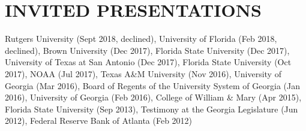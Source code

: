 \documentclass[letterpaper,11pt]{article}
\begin{document}
\section{INVITED PRESENTATIONS}
Rutgers University (Sept 2018, declined), University of Florida (Feb 2018, declined), Brown University (Dec 2017), Florida State University (Dec 2017), University of Texas at San Antonio (Dec 2017), Florida State University (Oct 2017), NOAA (Jul 2017), Texas A\&M University (Nov 2016), University of Georgia (Mar 2016), Board of Regents of the University System of Georgia (Jan 2016), University of Georgia (Feb 2016), College of William \& Mary (Apr 2015), Florida State University (Sep 2013), Testimony at the Georgia Legislature (Jun 2012), Federal Reserve Bank of Atlanta (Feb 2012)

%
\end{document}
